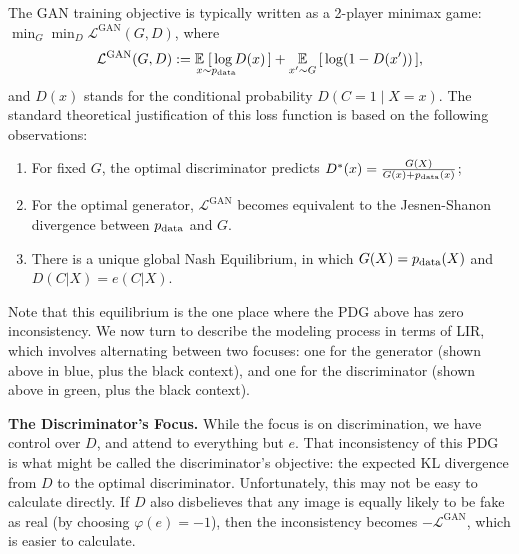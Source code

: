 The GAN training objective is typically written as a 2-player minimax game:
$
    \min_{G} \min_{D}  \mathcal L^{\text{GAN}}(G,D)
$, where
\[
\mathcal L^{\text{GAN}}(G,D) := \Ex_{\vphantom{|}x \mathrlap{\sim \pdata}}
    \;[\, \log D(x) \, ] + \Ex_{\vphantom{|} x' \sim G} \, [\,\log (1- D(x')) \,],
\]
and $D(x)$ stands for the conditional probability $D(C{=}1 \mid X={x})$. 
The standard theoretical justification of this loss function 
is based on the following observations:
\begin{enumerate}[nosep]
    \item For fixed $G$, the optimal discriminator predicts $D^*(x) = \frac{G(X)}{G(x) + p_{\mathrm{data}}(x)}$;
    \item For the optimal generator, $\mathcal L^{\text{GAN}}$ becomes equivalent to the Jesnen-Shanon divergence between $p_{\mathrm{data}}$ and $G$.
    \item There is a unique global Nash Equilibrium, in which $G(X) = p_{\mathrm{data}}(X)$ and $D(C | X) = e(C|X)$. 
\end{enumerate}
Note that this equilibrium is the one place where the PDG above has zero inconsistency. 
We now turn to describe the modeling process in terms of LIR, which involves alternating between two focuses: one for the generator (shown above in blue, plus the black context), and one for the discriminator (shown above in green, plus the black context). 


\textbf{The Discriminator's Focus.}
While the focus is on discrimination, 
    we have control over $D$, and attend to
    everything but $e$.
That inconsistency of this PDG is what might be called
    the discriminator's objective:
    the expected KL divergence from $D$ to the optimal discriminator.
Unfortunately, this may not be easy to calculate directly. 
If $D$ also disbelieves that any image is equally likely to be fake as real
    (by choosing $\varphi(e) = -1$),
then the inconsistency becomes $-\mathcal L^{\text{GAN}}$, which is easier to calculate.

